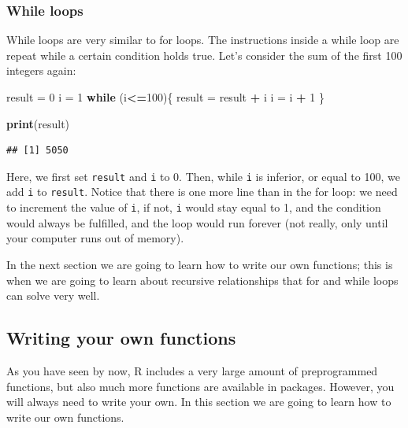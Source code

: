 \documentclass[]{gitbook}
\newenvironment{Shaded}{\begin{snugshade}}{\end{snugshade}}
\newcommand{\ControlFlowTok}[1]{\textcolor[rgb]{0.13,0.29,0.53}{\textbf{#1}}}
\newcommand{\DecValTok}[1]{\textcolor[rgb]{0.00,0.00,0.81}{#1}}
\newcommand{\KeywordTok}[1]{\textcolor[rgb]{0.13,0.29,0.53}{\textbf{#1}}}
\newcommand{\NormalTok}[1]{#1}
\newcommand{\OperatorTok}[1]{\textcolor[rgb]{0.81,0.36,0.00}{\textbf{#1}}}
\newcommand{\StringTok}[1]{\textcolor[rgb]{0.31,0.60,0.02}{#1}}
\theoremstyle{definition}
\theoremstyle{definition}
\theoremstyle{definition}
\theoremstyle{remark}
\begin{document}
\hypertarget{while-loops}{%
\subsubsection{While loops}\label{while-loops}}

While loops are very similar to for loops. The instructions inside a
while loop are repeat while a certain condition holds true. Let's
consider the sum of the first 100 integers again:

\begin{Shaded}
\begin{Highlighting}[]
\NormalTok{result =}\StringTok{ }\DecValTok{0}
\NormalTok{i =}\StringTok{ }\DecValTok{1}
\ControlFlowTok{while}\NormalTok{ (i}\OperatorTok{<=}\DecValTok{100}\NormalTok{)\{}
\NormalTok{  result =}\StringTok{ }\NormalTok{result }\OperatorTok{+}\StringTok{ }\NormalTok{i}
\NormalTok{  i =}\StringTok{ }\NormalTok{i }\OperatorTok{+}\StringTok{ }\DecValTok{1}
\NormalTok{\}}

\KeywordTok{print}\NormalTok{(result)}
\end{Highlighting}
\end{Shaded}

\begin{verbatim}
## [1] 5050
\end{verbatim}

Here, we first set \texttt{result} and \texttt{i} to 0. Then, while
\texttt{i} is inferior, or equal to 100, we add \texttt{i} to
\texttt{result}. Notice that there is one more line than in the for
loop: we need to increment the value of \texttt{i}, if not, \texttt{i}
would stay equal to 1, and the condition would always be fulfilled, and
the loop would run forever (not really, only until your computer runs
out of memory).

In the next section we are going to learn how to write our own
functions; this is when we are going to learn about recursive
relationships that for and while loops can solve very well.

\hypertarget{writing-your-own-functions}{%
\subsection{Writing your own
functions}\label{writing-your-own-functions}}

As you have seen by now, R includes a very large amount of preprogrammed
functions, but also much more functions are available in packages.
However, you will always need to write your own. In this section we are
going to learn how to write our own functions.
\end{document}
